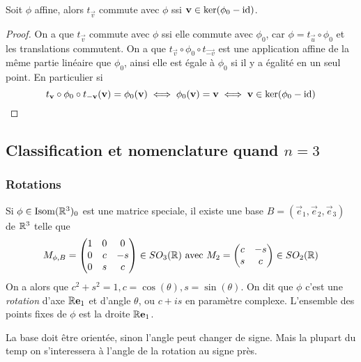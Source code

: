 \begin{proposition}
	Soit $\phi$ affine, alors $t_{\vec{v}}$ commute avec $\phi$ ssi $\mathbf{v} \in
	\ker(\phi_0 - \operatorname{id})$.
\end{proposition}

\begin{proof}	
	On a que $t_{\vec{v}}$ commute avec $\phi$ ssi elle commute avec $\phi_0$,
	car $\phi = t_{\vec{u}} \circ \phi_0$ et les translations commutent.
	On a que $t_{\vec{v}}\circ \phi_0 \circ t_{\vec{-v}}$ est une application
	affine de la même partie linéaire que $\phi_0$, ainsi elle est égale à
	$\phi_0$ si il y a égalité en un seul point. En particulier si
	\begin{equation*}
		t_{\mathbf{v}} \circ \phi_0 \circ t_{\mathbf{-v}} (\mathbf{v}) = \phi_0(\mathbf{v})	
		\iff \phi_0(\mathbf{v}) = \mathbf{v} \iff \mathbf{v} \in \ker(\phi_0 - \operatorname{id})
	\end{equation*}
\end{proof}

\subsection{Classification et nomenclature quand $n=3$}

\subsubsection{Rotations}
Si $\phi \in \operatorname{Isom}(\mathbb{R}^3)_0$ est une matrice speciale, il existe une base $B =
(\vec{e}_1, \vec{e}_2, \vec{e}_3)$ de
$\mathbb{R}^3$ telle que
\begin{equation*}
	M_{\phi, B} = 
	\begin{pmatrix}
		1 & 0 & 0 \\
		0 & c & -s \\
		0 & s & c
	\end{pmatrix}
	\in SO_3(\mathbb{R})\textrm{ avec }M_2 = 
	\begin{pmatrix}
		c & -s \\
		s & c
	\end{pmatrix}
	\in SO_2(\mathbb{R})
\end{equation*}
On a alors que $c^2 + s^2 = 1, c = \cos(\theta), s = \sin(\theta)$.
On dit que $\phi$ c'est une \emph{rotation} d'axe $\mathbb{R}\mathbf{e}_1$ et d'angle
$\theta$, ou $c + is$ en paramètre complexe. L'ensemble des points fixes de
$\phi$ est la
droite $\mathbb{R}\mathbf{e}_1$.
\begin{remark}
	La base doit être orientée, sinon l'angle peut changer de signe. Mais la
	plupart du temp on s'interessera à l'angle de la rotation au signe près.
\end{remark}

